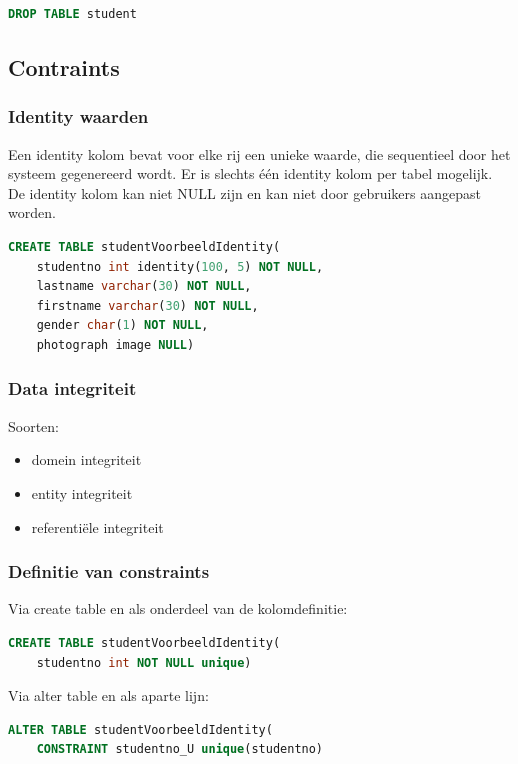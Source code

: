 \documentclass[a4paper,12pt]{article}
\begin{document}
\begin{lstlisting}[language=sql, breaklines=true]
DROP TABLE student
\end{lstlisting}

\subsection{Contraints}
\subsubsection{Identity waarden}
Een identity kolom bevat voor elke rij een unieke waarde, die sequentieel door het systeem gegenereerd wordt.
Er is slechts één identity kolom per tabel mogelijk.
De identity kolom kan niet NULL zijn en kan niet door gebruikers aangepast worden.

\begin{lstlisting}[language=sql, breaklines=true]
CREATE TABLE studentVoorbeeldIdentity(
	studentno int identity(100, 5) NOT NULL,
	lastname varchar(30) NOT NULL,
	firstname varchar(30) NOT NULL,
	gender char(1) NOT NULL,
	photograph image NULL)
\end{lstlisting}

\subsubsection{Data integriteit}
Soorten:
\begin{itemize}
\item domein integriteit
\item entity integriteit
\item referentiële integriteit
\end{itemize}

\subsubsection{Definitie van constraints}
Via create table en als onderdeel van de kolomdefinitie:
\begin{lstlisting}[language=sql, breaklines=true]
CREATE TABLE studentVoorbeeldIdentity(
	studentno int NOT NULL unique)
\end{lstlisting}

Via alter table en als aparte lijn:
\begin{lstlisting}[language=sql, breaklines=true]
ALTER TABLE studentVoorbeeldIdentity(
	CONSTRAINT studentno_U unique(studentno)
\end{lstlisting}
\end{document}
